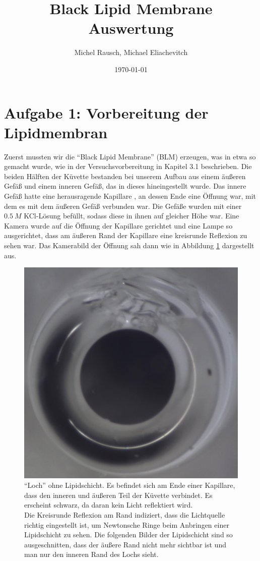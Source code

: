 \documentclass[a4paper,ngerman]{scrartcl}
\title{Black Lipid Membrane\\ Auswertung}
\date{\today}
\author{Michel Rausch, Michael Eliachevitch}
\begin{document}
\maketitle
\tableofcontents
\newpage

\section{Aufgabe 1: Vorbereitung der Lipidmembran}
Zuerst mussten wir die "`Black Lipid Membrane"' (BLM) erzeugen, was in etwa so gemacht wurde, wie in der Versuchsvorbereitung in Kapitel 3.1 beschrieben.
Die beiden Hälften der Küvette bestanden bei unserem Aufbau aus einem äußeren Gefäß und einem inneren Gefäß, das in dieses hineingestellt wurde.
Das innere Gefäß hatte eine herausragende Kapillare , an dessen Ende eine Öffnung war, mit dem es mit dem äußeren Gefäß verbunden war.
Die Gefäße wurden mit einer $\SI{0.5}{M}$ KCl-Lösung  befüllt, sodass
diese in ihnen auf gleicher Höhe war. Eine Kamera wurde auf die
Öffnung der Kapillare
gerichtet und eine Lampe so ausgerichtet, dass am äußeren Rand der Kapillare eine kreisrunde Reflexion zu sehen war. Das Kamerabild der Öffnung sah dann wie in Abbildung \ref{fig:loch} dargestellt aus. 

\begin{figure}[tbh!]
  \centering
  \includegraphics[width=.4\textwidth]{abbildungen/ohnelipidschicht_cut.jpg}
  \caption{"`Loch"' ohne Lipidschicht. Es befindet sich am Ende einer Kapillare, dass den inneren und äußeren Teil der Küvette verbindet.
Es erscheint schwarz, da daran kein Licht reflektiert wird.\\
Die Kreisrunde Reflexion am Rand indiziert, dass die Lichtquelle richtig eingestellt ist, um Newtonsche Ringe beim Anbringen einer
Lipidschicht zu sehen. Die folgenden Bilder der Lipidschicht sind so ausgeschnitten, dass der äußere Rand nicht mehr sichtbar ist und man nur den inneren Rand des Lochs sieht.}
  \label{fig:loch}
\end{figure}
\end{document}
